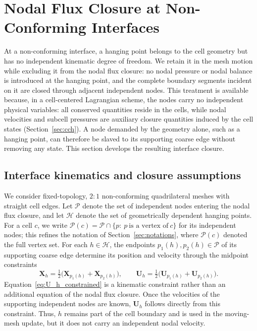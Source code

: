 \documentclass[a4paper]{cas-sc}
\begin{document}
\section{Nodal Flux Closure at Non-Conforming Interfaces}
\label{sec:hanging_solver}

At a non-conforming interface, a hanging point belongs to the cell geometry but has no independent kinematic degree of freedom. We retain it in the mesh motion while excluding it from the nodal flux closure: no nodal pressure or nodal balance is introduced at the hanging point, and the complete boundary segments incident on it are closed through adjacent independent nodes. This treatment is available because, in a cell-centered Lagrangian scheme, the nodes carry no independent physical variables: all conserved quantities reside in the cells, while nodal velocities and subcell pressures are auxiliary closure quantities induced by the cell states (Section~\ref{sec:cch}). A node demanded by the geometry alone, such as a hanging point, can therefore be slaved to its supporting coarse edge without removing any state. This section develops the resulting interface closure.

\subsection{Interface kinematics and closure assumptions}
\label{sec:nonconforming_notations}

We consider fixed-topology, $2\!:\!1$ non-conforming quadrilateral meshes with straight cell edges. Let $\mathcal P$ denote the set of independent nodes entering the nodal flux closure, and let $\mathcal H$ denote the set of geometrically dependent hanging points. For a cell $c$, we write $\mathcal P(c)=\mathcal P\cap\{p:\ p\ \text{is a vertex of}\ c\}$ for its independent nodes; this refines the notation of Section~\ref{sec:notations}, where $\mathcal P(c)$ denoted the full vertex set. For each $h\in\mathcal H$, the endpoints $p_1(h),p_2(h)\in\mathcal P$ of its supporting coarse edge determine its position and velocity through the midpoint constraints
\begin{equation}
 \boldsymbol X_h=\tfrac12\bigl(\boldsymbol X_{p_1(h)}+\boldsymbol X_{p_2(h)}\bigr),
 \qquad
 \boldsymbol U_h=\tfrac12\bigl(\boldsymbol U_{p_1(h)}+\boldsymbol U_{p_2(h)}\bigr).
 \label{eq:U_h_constrained}
\end{equation}
Equation~\eqref{eq:U_h_constrained} is a kinematic constraint rather than an additional equation of the nodal flux closure. Once the velocities of the supporting independent nodes are known, $\boldsymbol U_h$ follows directly from this constraint. Thus, $h$ remains part of the cell boundary and is used in the moving-mesh update, but it does not carry an independent nodal velocity.
\end{document}
